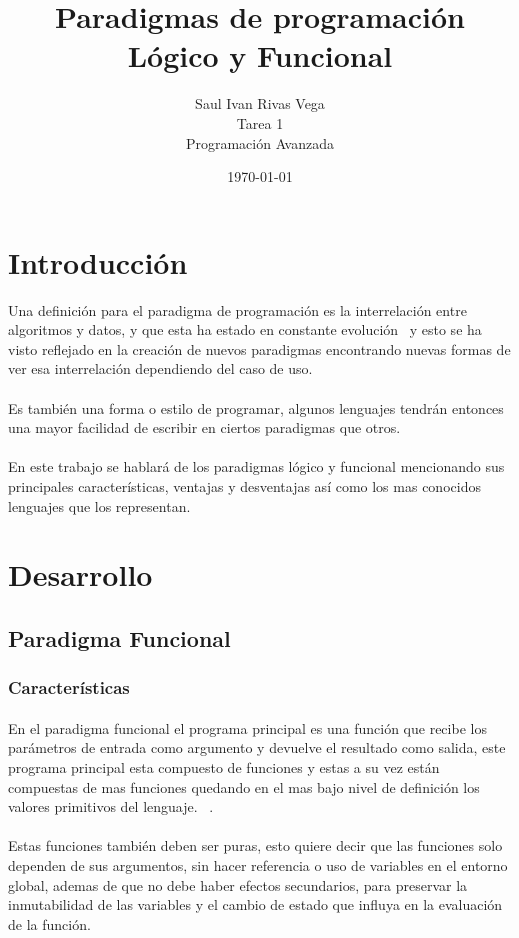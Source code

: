\documentclass[12pt]{article}
\title{Paradigmas de programación Lógico y Funcional}
\author{
	Saul Ivan Rivas Vega \\
	Tarea 1\\
	Programación Avanzada\\
}
\date{\today}
\begin{document}
	\maketitle
	
	\section{Introducción}
	Una definición para el paradigma de programación es la interrelación entre algoritmos y datos, y que esta ha estado en constante evolución~\cite{joyanes_aguilar_fundamentos_2008} y esto se ha visto reflejado en la creación de nuevos paradigmas encontrando nuevas formas de ver esa interrelación dependiendo del caso de uso.
	\paragraph{}
	Es también una forma o estilo de programar, algunos lenguajes tendrán entonces una mayor facilidad  de escribir en ciertos paradigmas que otros.~\cite{loyola_university}
	\paragraph{}
	En este trabajo se hablará de los paradigmas lógico y funcional mencionando sus principales características, ventajas y desventajas así como los mas conocidos lenguajes que los representan.
	\section{Desarrollo}\label{desarrollo}
	
	
	\subsection{Paradigma Funcional}
	\subsubsection{Características}
	\paragraph{}
	En el paradigma funcional el programa principal es una función que recibe los parámetros de entrada como argumento y devuelve el resultado como salida, este programa principal esta compuesto de funciones y estas a su vez están compuestas de mas funciones quedando en el mas bajo nivel de definición los valores primitivos del lenguaje. ~\cite{why_functional}.
	\paragraph{}
	Estas funciones también deben ser puras, esto quiere decir que las funciones solo dependen de sus argumentos, sin hacer referencia o uso de variables en el entorno global, ademas de que no debe haber efectos secundarios, para preservar la inmutabilidad de las variables y el cambio de estado que influya en la evaluación de la función. ~\cite{hack_fp}
\end{document}
